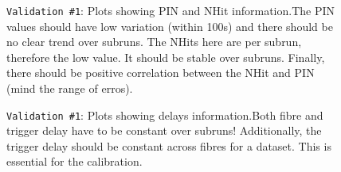 \documentclass[12pt]{article}
\begin{document}
\begin{figure}
\centering
\noindent{}
  \caption{\centering \texttt{Validation \#1}: Plots showing PIN and NHit information.\hspace{\textwidth}The PIN values should have low variation (within 100s) and there should be no clear trend over subruns. The NHits here are per subrun, therefore the low value. It should be stable over subruns. Finally, there should be positive correlation between the NHit and PIN (mind the range of erros).}
  \label{fig:val11}
\end{figure}

\begin{figure}
\centering
\noindent{}
  \caption{\centering \texttt{Validation \#1}: Plots showing delays information.\hspace{\textwidth}Both fibre and trigger delay have to be constant over subruns! Additionally, the trigger delay should be constant across fibres for a dataset. This is essential for the calibration.}
  \label{fig:val12}
\end{figure}
\end{document}
